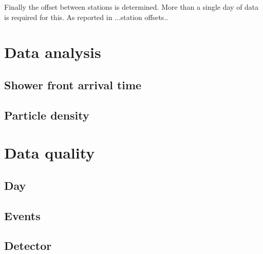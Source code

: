 Finally the offset between stations is determined. More than a single day of data is required for this. As reported in ...station offsets..


\section{Data analysis}

\subsection{Shower front arrival time}

\subsection{Particle density}


\section{Data quality}

\subsection{Day}

\subsection{Events}

\subsection{Detector}
